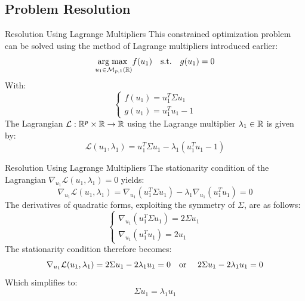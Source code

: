 \subsection[Problem Resolution]{Problem Resolution}

\begin{frame}{Resolution Using Lagrange Multipliers}
	This constrained optimization problem can be solved using the method of Lagrange multipliers introduced earlier:
	\begin{equation}
		\underset{u_1 \in \mathcal{M}_{p,1}(\mathbb{R})}{\operatorname{arg\;max}\;} f(u_1) \quad \text{s.t.} \quad g(u_1) = 0
		\nonumber
	\end{equation}
	With:
	\begin{equation}
		\begin{cases}
			f(u_1) = u_1^T \Sigma u_1 \\
			g(u_1) = u_1^T u_1 - 1
		\end{cases}
		\nonumber
	\end{equation}
	\pause
	The Lagrangian $\mathcal{L}: \mathbb{R}^p \times \mathbb{R} \to \mathbb{R}$ using the Lagrange multiplier $\lambda_1 \in \mathbb{R}$ is given by:
	\begin{equation}
		\mathcal{L}(u_1, \lambda_1) = u_1^T \Sigma u_1 - \lambda_1 \left(u_1^T u_1 - 1\right)
		\nonumber
	\end{equation}
\end{frame}

\begin{frame}{Resolution Using Lagrange Multipliers}
	The stationarity condition of the Lagrangian $\nabla_{u_1} \mathcal{L}(u_1, \lambda_1) = 0$ yields:
	\begin{equation}
		\nabla_{u_1} \mathcal{L}(u_1, \lambda_1) = \nabla_{u_1}\left(u_1^T \Sigma u_1\right) - \lambda_1 \nabla_{u_1}\left(u_1^T u_1\right) = 0
		\nonumber
	\end{equation}
	\pause
	The derivatives of quadratic forms, exploiting the symmetry of $\Sigma$, are as follows:
	\begin{equation}
		\begin{cases}
			\nabla_{u_1}\left(u_1^T \Sigma u_1\right) = 2 \Sigma u_1 \\
			\nabla_{u_1}\left(u_1^T u_1\right) = 2 u_1
		\end{cases}
		\nonumber
	\end{equation}
	\pause
	The stationarity condition therefore becomes:
	\begin{equation}
		\nabla_{u_1} \mathcal{L}(u_1, \lambda_1) = 2 \Sigma u_1 - 2 \lambda_1 u_1 = 0
		\text{\quad or \quad} 2 \Sigma u_1 - 2 \lambda_1 u_1 = 0
		\nonumber
	\end{equation}
	Which simplifies to:
	\begin{equation}
		\Sigma u_1 = \lambda_1 u_1
		\nonumber
	\end{equation}
\end{frame}

